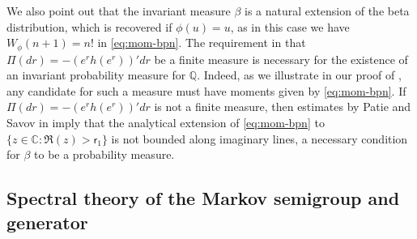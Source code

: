 \documentclass[JEP,XML,SOM,Unicode]{cedram}
\theoremstyle{plain}
\theoremstyle{definition}
\newcommand{\J}{\mathds{Q}}
\newcommand{\vat}{{\mathsf{r}_1}}
\let\bpsi\beta
\begin{document}
We also point out that the invariant measure $\bpsi$ is a natural extension of the beta distribution, which is recovered if $\phi(u) = u$, as in this case we have $W_\phi(n+1)=n!$ in \eqref{eq:mom-bpn}. The requirement in  that $\Pi(dr) = -(e^rh(e^r))'dr$ be a finite measure is necessary for the existence of an invariant probability measure for $\J$. Indeed, as we illustrate in our proof of , any candidate for such a measure must have moments given by \eqref{eq:mom-bpn}. If $\Pi(dr) = -(e^rh(e^r))'dr$ is not a finite measure, then estimates by Patie and Savov in \cite[Th.\,3.3]{Patie-Savov-Bern} imply that the analytical extension of \eqref{eq:mom-bpn} to $\{z \in \mathbb{C} : \Re(z) > \vat\}$ is not bounded along imaginary lines, a necessary condition for $\beta$ to be a probability measure.

\subsection{Spectral theory of the Markov semigroup and generator}
\end{document}
